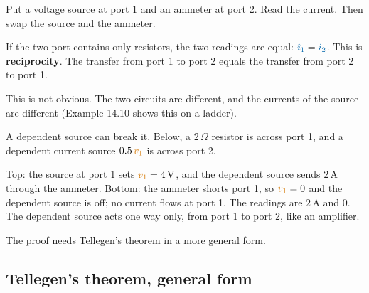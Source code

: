 \documentclass[11pt,a4paper]{article}
\newcommand{\Icol}[1]{\textcolor{ccur}{#1}}
\newcommand{\Vcol}[1]{\textcolor{cvolt}{#1}}
\newcommand{\uni}[1]{\,\mathrm{#1}}
\newcommand{\A}{\uni{A}}   \newcommand{\V}{\uni{V}}
\newcommand{\ohm}{\,\Omega}
\newcommand{\vone}{\Vcol{v_1}}  \newcommand{\vtwo}{\Vcol{v_2}}
\newcommand{\rcp}[4]{%
  \draw[elem] (1.6,-0.2) rectangle (3.8,2.2);
  \node[align=center, font=\small] at (2.7,1.0) {LTI\\ resistors};
  \draw (1.1,1.8) -- (1.6,1.8); \draw (1.1,0) -- (1.6,0);
  \draw (3.8,1.8) -- (4.3,1.8); \draw (3.8,0) -- (4.3,0);
  \ifcase#1
    \draw (0,1.8) to[american voltage source, l_=#2] (0,0); \draw (0,1.8) -- (1.1,1.8); \draw (0,0) -- (1.1,0);
  \or
    \draw (0,0) to[american current source, l=#2] (0,1.8); \draw (0,1.8) -- (1.1,1.8); \draw (0,0) -- (1.1,0);
  \or
    \draw (0,1.8) -- (0,0); \draw (0,1.8) -- (1.1,1.8); \draw (0,0) -- (1.1,0);
    \draw[iar] (0.25,2.08) -- (0.85,2.08); \node[font=\small, anchor=south] at (0.55,2.12) {#2};
  \or
    \node[pol] at (1.05,1.45) {$+$}; \node[pol] at (1.05,0.35) {$-$};
    \node[font=\small, anchor=east] at (1.0,0.9) {#2};
  \or
    \draw (0,1.8) -- (0,1.22); \draw (0,0.58) -- (0,0);
    \node[circle, draw, thick, minimum size=0.64cm, inner sep=0pt, font=\small\bfseries] at (0,0.9) {A};
    \node[font=\small, anchor=east] at (-0.38,0.9) {#2};
    \draw (0,1.8) -- (1.1,1.8); \draw (0,0) -- (1.1,0);
  \fi
  \ifcase#3
    \draw (5.4,1.8) to[american voltage source, l=#4] (5.4,0); \draw (4.3,1.8) -- (5.4,1.8); \draw (4.3,0) -- (5.4,0);
  \or
    \draw (5.4,0) to[american current source, l_=#4] (5.4,1.8); \draw (4.3,1.8) -- (5.4,1.8); \draw (4.3,0) -- (5.4,0);
  \or
    \draw (5.4,1.8) -- (5.4,0); \draw (4.3,1.8) -- (5.4,1.8); \draw (4.3,0) -- (5.4,0);
    \draw[iar] (5.15,2.08) -- (4.55,2.08); \node[font=\small, anchor=south] at (4.85,2.12) {#4};
  \or
    \node[pol] at (4.35,1.45) {$+$}; \node[pol] at (4.35,0.35) {$-$};
    \node[font=\small, anchor=west] at (4.4,0.9) {#4};
  \or
    \draw (5.4,1.8) -- (5.4,1.22); \draw (5.4,0.58) -- (5.4,0);
    \node[circle, draw, thick, minimum size=0.64cm, inner sep=0pt, font=\small\bfseries] at (5.4,0.9) {A};
    \node[font=\small, anchor=west] at (5.78,0.9) {#4};
    \draw (4.3,1.8) -- (5.4,1.8); \draw (4.3,0) -- (5.4,0);
  \fi
  \draw (1.1,1.8) node[ocirc] {}; \draw (1.1,0) node[ocirc] {};
  \draw (4.3,1.8) node[ocirc] {}; \draw (4.3,0) node[ocirc] {};}
\newcommand{\depRecip}[4]{%
  \draw[elem] (1.5,-0.25) rectangle (6.4,2.25);
  \draw (1.1,1.8) -- (2.2,1.8) to[R, l_=$2\ohm$] (2.2,0);
  \node[pol] at (3.15,1.45) {$+$}; \node[pol] at (3.15,0.35) {$-$}; \node[text=cvolt, font=\small] at (3.15,0.9) {$v_1$};
  \draw (4.2,1.8) to[american controlled current source, l=$0.5\,\Vcol{v_1}$] (4.2,0);
  \draw (4.2,1.8) -- (6.8,1.8); \draw (1.1,0) -- (6.8,0);
  \ifcase#1
    \draw (0,1.8) to[american voltage source, l_=#2] (0,0); \draw (0,1.8) -- (1.1,1.8); \draw (0,0) -- (1.1,0);
  \or\or\or\or
    \draw (0,1.8) -- (0,1.22); \draw (0,0.58) -- (0,0);
    \node[circle, draw, thick, minimum size=0.64cm, inner sep=0pt, font=\small\bfseries] at (0,0.9) {A};
    \node[font=\small, anchor=east] at (-0.38,0.9) {#2};
    \draw (0,1.8) -- (1.1,1.8); \draw (0,0) -- (1.1,0);
  \fi
  \ifcase#3
    \draw (7.9,1.8) to[american voltage source, l=#4] (7.9,0); \draw (6.8,1.8) -- (7.9,1.8); \draw (6.8,0) -- (7.9,0);
  \or\or\or\or
    \draw (7.9,1.8) -- (7.9,1.22); \draw (7.9,0.58) -- (7.9,0);
    \node[circle, draw, thick, minimum size=0.64cm, inner sep=0pt, font=\small\bfseries] at (7.9,0.9) {A};
    \node[font=\small, anchor=west] at (8.28,0.9) {#4};
    \draw (6.8,1.8) -- (7.9,1.8); \draw (6.8,0) -- (7.9,0);
  \fi
  \foreach \p in {(1.1,1.8),(1.1,0),(6.8,1.8),(6.8,0)} \draw \p node[ocirc] {};}
\begin{document}
Put a voltage source at port 1 and an ammeter at port 2. Read the current. Then swap the
source and the ammeter.
\begin{center}
\end{center}
If the two-port contains only resistors, the two readings are equal: $\Icol{\hat\imath_1} = \itwo$.
This is \textbf{reciprocity}. The transfer from port 1 to port 2 equals the transfer from
port 2 to port 1.

This is not obvious. The two circuits are different, and the currents of the source are
different (Example 14.10 shows this on a ladder).

A dependent source can break it. Below, a $2\ohm$ resistor is across port 1, and a
dependent current source $0.5\,\vone$ is across port 2.
\begin{center}
\end{center}
Top: the source at port 1 sets $\vone = 4\V$, and the dependent source sends $2\A$ through
the ammeter. Bottom: the ammeter shorts port 1, so $\vone = 0$ and the dependent source is
off; no current flows at port 1. The readings are $2\A$ and $0$. The dependent source acts
one way only, from port 1 to port 2, like an amplifier.

The proof needs Tellegen's theorem in a more general form.

\subsection{Tellegen's theorem, general form}
\end{document}
